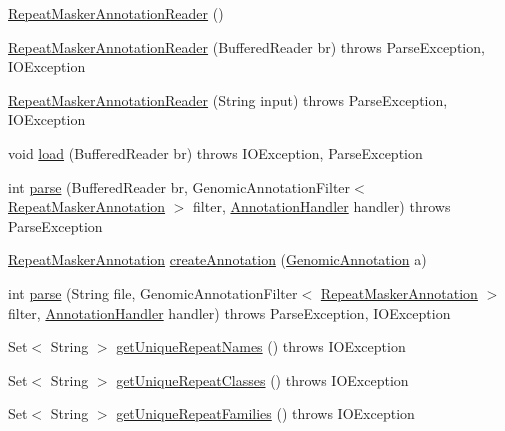 \begin{DoxyCompactItemize}
\item 
\hyperlink{classbroad_1_1core_1_1annotation_1_1_repeat_masker_annotation_reader_ae687d477301d3e3ba7991054f6e42eb1}{Repeat\+Masker\+Annotation\+Reader} ()
\item 
\hyperlink{classbroad_1_1core_1_1annotation_1_1_repeat_masker_annotation_reader_a19d30691b8496873e654affd5096d91e}{Repeat\+Masker\+Annotation\+Reader} (Buffered\+Reader br)  throws Parse\+Exception, I\+O\+Exception 
\item 
\hyperlink{classbroad_1_1core_1_1annotation_1_1_repeat_masker_annotation_reader_a05cdd9872f59ae551d206f20f36fa83f}{Repeat\+Masker\+Annotation\+Reader} (String input)  throws Parse\+Exception, I\+O\+Exception 
\item 
void \hyperlink{classbroad_1_1core_1_1annotation_1_1_repeat_masker_annotation_reader_a20c8fa15e7bdac2c602df8278b7a1fbf}{load} (Buffered\+Reader br)  throws I\+O\+Exception, Parse\+Exception 
\item 
int \hyperlink{classbroad_1_1core_1_1annotation_1_1_repeat_masker_annotation_reader_a0ad5bfb2adb4523e87bb5ff7e7e43680}{parse} (Buffered\+Reader br, Genomic\+Annotation\+Filter$<$ \hyperlink{classbroad_1_1core_1_1annotation_1_1_repeat_masker_annotation}{Repeat\+Masker\+Annotation} $>$ filter, \hyperlink{interfacebroad_1_1core_1_1annotation_1_1_annotation_handler}{Annotation\+Handler} handler)  throws Parse\+Exception 
\item 
\hyperlink{classbroad_1_1core_1_1annotation_1_1_repeat_masker_annotation}{Repeat\+Masker\+Annotation} \hyperlink{classbroad_1_1core_1_1annotation_1_1_repeat_masker_annotation_reader_a28135a78c93863178ac6e4e06eb2e6fa}{create\+Annotation} (\hyperlink{interfacebroad_1_1core_1_1annotation_1_1_genomic_annotation}{Genomic\+Annotation} a)
\item 
int \hyperlink{classbroad_1_1core_1_1annotation_1_1_repeat_masker_annotation_reader_a2f421430a12c8efc3a89cd824ad60de0}{parse} (String file, Genomic\+Annotation\+Filter$<$ \hyperlink{classbroad_1_1core_1_1annotation_1_1_repeat_masker_annotation}{Repeat\+Masker\+Annotation} $>$ filter, \hyperlink{interfacebroad_1_1core_1_1annotation_1_1_annotation_handler}{Annotation\+Handler} handler)  throws Parse\+Exception, I\+O\+Exception 
\item 
Set$<$ String $>$ \hyperlink{classbroad_1_1core_1_1annotation_1_1_repeat_masker_annotation_reader_a82a9c1f12e02483e928455d343134e1a}{get\+Unique\+Repeat\+Names} ()  throws I\+O\+Exception 
\item 
Set$<$ String $>$ \hyperlink{classbroad_1_1core_1_1annotation_1_1_repeat_masker_annotation_reader_af6b0938d08085b5f8e915a8bab93f8e2}{get\+Unique\+Repeat\+Classes} ()  throws I\+O\+Exception 
\item 
Set$<$ String $>$ \hyperlink{classbroad_1_1core_1_1annotation_1_1_repeat_masker_annotation_reader_aa575a5e82057feaaf50e66bf628028d8}{get\+Unique\+Repeat\+Families} ()  throws I\+O\+Exception 
\end{DoxyCompactItemize}


